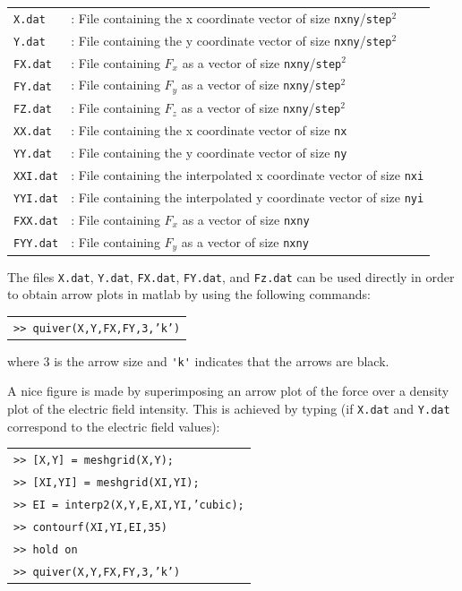 \documentclass[12pt]{report}
\begin{document}
\begin{tabular}{ll}
\texttt{X.dat} &: File containing the x coordinate vector of size \verb+nx+\verb+ny+/\verb+step+$^2$\\
\texttt{Y.dat} &: File containing the y coordinate vector of size \verb+nx+\verb+ny+/\verb+step+$^2$\\
\texttt{FX.dat} &: File containing $F_x$ as a vector of size \verb+nx+\verb+ny+/\verb+step+$^2$\\
\texttt{FY.dat} &: File containing $F_y$ as a vector of size \verb+nx+\verb+ny+/\verb+step+$^2$\\
\texttt{FZ.dat} &: File containing $F_z$ as a vector of size \verb+nx+\verb+ny+/\verb+step+$^2$\\
\texttt{XX.dat} &: File containing the x coordinate vector of size \verb+nx+\\
\texttt{YY.dat} &: File containing the y coordinate vector of size \verb+ny+\\
\texttt{XXI.dat} &: File containing the interpolated x coordinate vector of size \verb+nxi+\\
\texttt{YYI.dat} &: File containing the interpolated y coordinate vector of size \verb+nyi+\\
\texttt{FXX.dat} &: File containing $F_x$ as a vector of size \verb+nx+\verb+ny+\\
\texttt{FYY.dat} &: File containing $F_y$ as a vector of size \verb+nx+\verb+ny+\\
\end{tabular}

The files \verb+X.dat+, \verb+Y.dat+, \verb+FX.dat+, \verb+FY.dat+, and \verb+Fz.dat+ can be used directly in order to obtain arrow plots in matlab by using the following commands:

\begin{tabular}{l}
\texttt{>> quiver(X,Y,FX,FY,3,'k')}
\end{tabular}

where 3 is the arrow size and \verb+'k'+ indicates that the arrows are black.

A nice figure is made by superimposing an arrow plot of the force over a density plot of the electric field intensity. This is achieved by typing (if \verb+X.dat+ and \verb+Y.dat+ correspond to the electric field values):

\begin{tabular}{l}
\texttt{>> [X,Y] = meshgrid(X,Y);}\\
\texttt{>> [XI,YI] = meshgrid(XI,YI);}\\
\texttt{>> EI = interp2(X,Y,E,XI,YI,'cubic);}\\
\texttt{>> contourf(XI,YI,EI,35)}\\
\texttt{>> hold on}\\
\texttt{>> quiver(X,Y,FX,FY,3,'k')}
\end{tabular}
\end{document}
